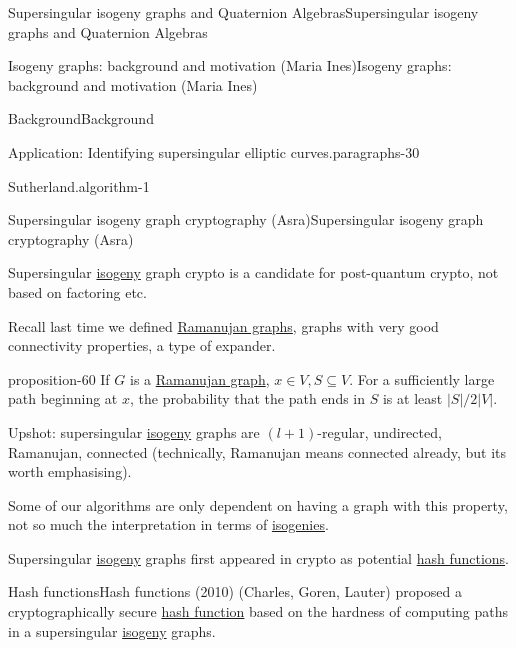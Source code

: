 \documentclass[10pt,]{book}
\numberwithin{equation}{section}
\begin{document}
\begin{chapterptx}{Supersingular isogeny graphs and Quaternion Algebras}{}{Supersingular isogeny graphs and Quaternion Algebras}{}{}
\begin{sectionptx}{Isogeny graphs: background and motivation (Maria Ines)}{}{Isogeny graphs: background and motivation (Maria Ines)}{}{}
\begin{subsectionptx}{Background}{}{Background}{}{}
\begin{paragraphs}{Application: Identifying supersingular elliptic curves.}{paragraphs-30}
\begin{algorithm}{Sutherland.}{}{algorithm-1}
\begin{enumerate}
\end{enumerate}
%
\end{algorithm}
\end{paragraphs}%
\end{subsectionptx}
\end{sectionptx}
%
%
\typeout{************************************************}
\typeout{************************************************}
%
\begin{sectionptx}{Supersingular isogeny graph cryptography (Asra)}{}{Supersingular isogeny graph cryptography (Asra)}{}{}\label{sec-supersing-isog-crypto}
\begin{introduction}{}%
\hypertarget{p-823}{}%
Supersingular \hyperref[def-supersing-isog-isog]{isogeny} graph crypto is a candidate for post-quantum crypto, not based on factoring etc.%
\par
\hypertarget{p-824}{}%
Recall last time we defined \hyperref[def-supersing-isog-ramanujan]{Ramanujan graphs}, graphs with very good connectivity properties, a type of expander.%
\begin{proposition}{}{}{proposition-60}%
\hypertarget{p-825}{}%
If \(G\) is a \hyperref[def-supersing-isog-ramanujan]{Ramanujan graph}, \(x\in V, S\subseteq V\). For a sufficiently large path beginning at \(x\), the probability that the path ends in \(S\) is at least \(|S|/2|V|\).%
\end{proposition}
\hypertarget{p-826}{}%
Upshot: supersingular \hyperref[def-supersing-isog-isog]{isogeny} graphs are \((l +1)\)-regular, undirected, Ramanujan, connected (technically, Ramanujan means connected already, but its worth emphasising).%
\par
\hypertarget{p-827}{}%
Some of our algorithms are only dependent on having a graph with this property, not so much the interpretation in terms of \hyperref[def-supersing-isog-isog]{isogenies}.%
\par
\hypertarget{p-828}{}%
Supersingular \hyperref[def-supersing-isog-isog]{isogeny} graphs first appeared in crypto as potential \hyperref[def-hash-function]{hash functions}.%
\end{introduction}%
%
%
\typeout{************************************************}
\typeout{************************************************}
%
\begin{subsectionptx}{Hash functions}{}{Hash functions}{}{}\label{subsection-68}
\hypertarget{p-829}{}%
(2010) (Charles, Goren, Lauter) proposed a cryptographically secure \hyperref[def-hash-function]{hash function} based on the hardness of computing paths in a supersingular \hyperref[def-supersing-isog-isog]{isogeny} graphs.%

\end{subsectionptx}
\end{sectionptx}
\end{chapterptx}
\end{document}
